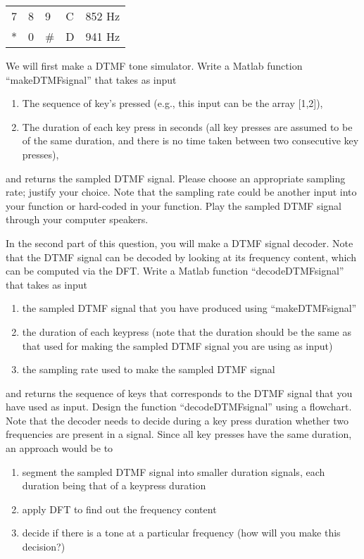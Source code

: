\begin{enumerate}
\begin{center}
\begin{tabular}{|l|l|l|l|l|}
      7 & 8 & 9 & C & 852 Hz \\
      * & 0 & \# & D & 941 Hz \\
      \hline      
    \end{tabular}
  \end{center}
  We will first make a DTMF tone simulator.
  Write a Matlab function ``makeDTMFsignal'' that takes as input
  \begin{enumerate}
  \item The sequence of key's pressed (e.g., this input can be the array [1,2]),
  \item The duration of each key press in seconds (all key presses are assumed to be of the same duration, and there is no time taken between two consecutive key presses),
  \end{enumerate}
  and returns the sampled DTMF signal. Please choose an appropriate sampling rate; justify your choice.
  Note that the sampling rate could be another input into your function or hard-coded in your function.
  Play the sampled DTMF signal through your computer speakers.

  In the second part of this question, you will make a DTMF signal decoder. Note that the DTMF signal can be decoded by looking at its frequency content, which can be computed via the DFT.
  Write a Matlab function ``decodeDTMFsignal'' that takes as input
  \begin{enumerate}
  \item the sampled DTMF signal that you have produced using ``makeDTMFsignal''
  \item the duration of each keypress (note that the duration should be the same as that used for making the sampled DTMF signal you are using as input)
  \item the sampling rate used to make the sampled DTMF signal
  \end{enumerate}
  and returns the sequence of keys that corresponds to the DTMF signal that you have used as input.
  Design the function ``decodeDTMFsignal'' using a flowchart.
  Note that the decoder needs to decide during a key press duration whether two frequencies are present in a signal.
  Since all key presses have the same duration, an approach would be to
  \begin{enumerate}
  \item segment the sampled DTMF signal into smaller duration signals, each duration being that of a keypress duration
  \item apply DFT to find out the frequency content
  \item decide if there is a tone at a particular frequency (how will you make this decision?)
  \end{enumerate}
\end{enumerate}

